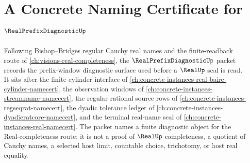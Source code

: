 \chapter{A Concrete Naming Certificate for $\RealPrefixDiagnosticUp$}
\label{ch:concrete-instances-real-prefix-diagnostic-namecert}

Following Bishop--Bridges regular Cauchy real names and the finite-readback route of \autoref{ch:visions-real-completeness}, the $\RealPrefixDiagnosticUp$ packet records the prefix-window diagnostic surface used before a $\RealUp$ seal is read. It sits after the finite cylinder interface of \autoref{ch:concrete-instances-real-baire-cylinder-namecert}, the observation windows of \autoref{ch:concrete-instances-streamname-namecert}, the regular rational source rows of \autoref{ch:concrete-instances-regseqrat-namecert}, the dyadic tolerance ledger of \autoref{ch:concrete-instances-dyadicratcore-namecert}, and the terminal real-name seal of \autoref{ch:concrete-instances-real-namecert}. The packet names a finite diagnostic object for the Real-completeness route; it is not a proof of $\RealUp$ completeness, a quotient of Cauchy names, a selected host limit, countable choice, trichotomy, or host real equality.

